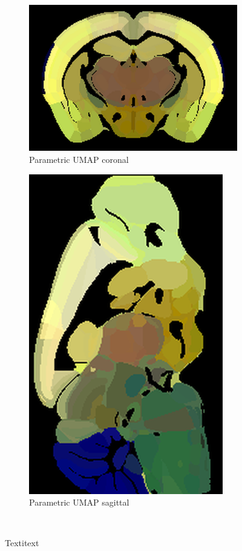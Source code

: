 \documentclass[]{article}
\begin{document}
\begin{figure}
	\begin{subfigure}{.43\textwidth}
		\centering
		\includegraphics[width=.9\linewidth]{../results/para_umap_ano_coronal_50_res_slice_1.png}
		\caption{Parametric UMAP coronal}
		\label{fig:ParaUMAP_cor}
	\end{subfigure}
	\begin{subfigure}{.3\textwidth}
		\centering
		\includegraphics[width=.9\linewidth, angle=270]{../results/para_umap_ano_sagittal_50_res_slice_1.png}
		\caption{Parametric UMAP sagittal}
		\label{fig:ParaUMAP_sag}
	\end{subfigure}\\

	\caption{Textitext}
	\label{fig:dim_red_vis}
\end{figure}
\end{document}
